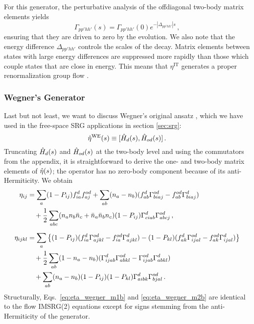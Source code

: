 For this generator, the perturbative analysis of the offdiagonal 
two-body matrix elements yields
\begin{equation}
  \Gamma_{pp'hh'}(s) = \Gamma_{pp'hh'}(0) e^{-|\Delta_{pp'hh'}|s}\,,
\end{equation}
ensuring that they are driven to zero by the evolution. We also
note that the energy difference $\Delta_{pp'hh'}$ controls
the scales of the decay. Matrix elements between states with large 
energy differences are suppressed more rapidly than those which
couple states that are close in energy. This means that $\eta^\text{IT}$ 
generates a proper renormalization group flow \cite{Kehrein:2006kx,Hergert:2016jk}.


%
%
\subsubsection{\label{sec:imsrg_generators_wegner}Wegner's Generator}
Last but not least, we want to discuss Wegner's original ansatz 
\cite{Wegner:1994dk}, which we have used in the free-space SRG applications 
in section \ref{sec:srg}:
\begin{equation}\label{eq:eta_wegner}
  \etaO^\text{WE}(s) \equiv \comm{\HO_d(s)}{\HO_{od}(s)}\,.
\end{equation}
Truncating $\hat{H}_d(s)$ and $\hat{H}_{od}(s)$ at the two-body level and using
the commutators from the appendix, it is straightforward to derive the 
one- and two-body matrix elements of $\hat{\eta}(s)$; the operator has no
zero-body component because of its anti-Hermiticity. We obtain
\begin{align}
  \eta_{ij} &= 
  \sum_{a}(1-P_{ij})f^d_{ia}f^{od}_{aj} +\sum_{ab}(n_a-n_b)(f^d_{ab}\Gamma^{od}_{biaj}-f^{od}_{ab}\Gamma^d_{biaj}) \notag\\ 
  &\quad +\frac{1}{2} \sum_{abc}(n_an_b\bar{n}_c+\bar{n}_a\bar{n}_bn_c) (1-P_{ij})\Gamma^d_{ciab}\Gamma^{od}_{abcj}
  \label{eq:eta_wegner_m1b}\,,\\[5pt]
  \eta_{ijkl}&= 
  \sum_{a}\left\{ 
    (1-P_{ij})(f^d_{ia}\Gamma^{od}_{ajkl}-f^{od}_{ia}\Gamma^{d}_{ajkl} )
    -(1-P_{kl})(f^{d}_{ak}\Gamma^{od}_{ijal}-f^{od}_{ak}\Gamma^d_{ijal} )
    \right\}\notag \\
  &\quad+ \frac{1}{2}\sum_{ab}(1-n_a-n_b)(\Gamma^d_{ijab}\Gamma^{od}_{abkl}-\Gamma^{od}_{ijab}\Gamma^d_{abkl})\notag\\
  &\quad+ \sum_{ab}(n_a-n_b) (1-P_{ij})(1-P_{kl})\Gamma^{d}_{aibk}\Gamma^{od}_{bjal}
    \label{eq:eta_wegner_m2b}\,.
\end{align}
Structurally, Eqs.~\eqref{eq:eta_wegner_m1b} and \eqref{eq:eta_wegner_m2b} 
are identical to the flow IMSRG(2) equations except for signs stemming from 
the anti-Hermiticity of the generator. 

